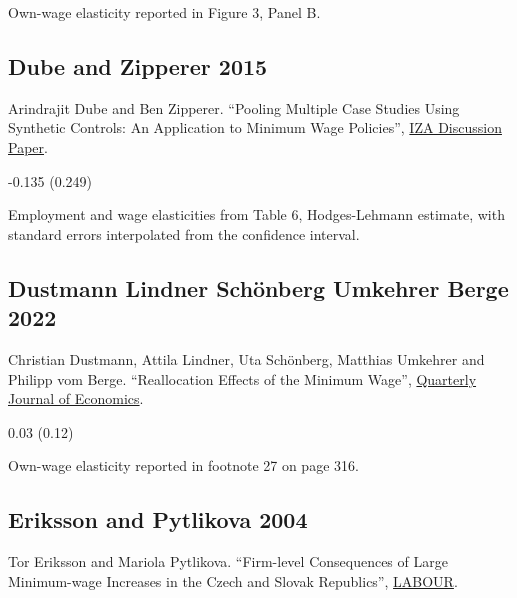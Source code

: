  Own-wage elasticity reported in Figure 3, Panel B.

\subsection*{Dube and Zipperer 2015}
\vspace{-0.7em}

\noindent Arindrajit Dube and Ben Zipperer. ``Pooling Multiple Case Studies Using Synthetic Controls: An Application to Minimum Wage Policies'', \href{https://docs.iza.org/dp8944.pdf}{IZA Discussion Paper}.

\vspace{0.7em}

 -0.135 (0.249)

\vspace{0.7em}

 Employment and wage elasticities from Table 6, Hodges-Lehmann estimate, with standard errors interpolated from the confidence interval.

\subsection*{Dustmann Lindner Schönberg Umkehrer Berge 2022}
\vspace{-0.7em}

\noindent Christian Dustmann, Attila Lindner, Uta Schönberg, Matthias Umkehrer and Philipp vom Berge. ``Reallocation Effects of the Minimum Wage'', \href{https://doi.org/10.1093/qje/qjab028}{Quarterly Journal of Economics}.

\vspace{0.7em}

 0.03 (0.12)

\vspace{0.7em}

 Own-wage elasticity reported in footnote 27 on page 316.

\subsection*{Eriksson and Pytlikova 2004}
\vspace{-0.7em}

\noindent Tor Eriksson and Mariola Pytlikova. ``Firm-level Consequences of Large Minimum-wage Increases in the Czech and Slovak Republics'', \href{https://doi.org/10.1111/j.1121-7081.2004.00259.x}{LABOUR}.

